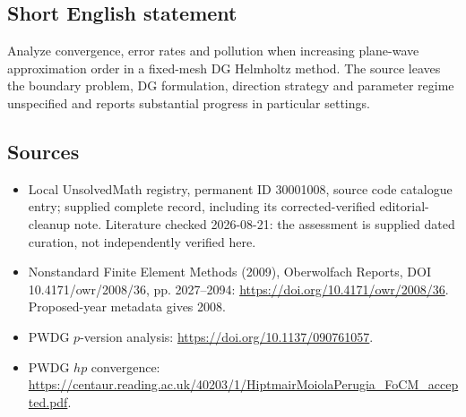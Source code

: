 \documentclass[11pt]{article}
\begin{document}
\subsection{Short English statement}
Analyze convergence, error rates and pollution when increasing plane-wave approximation order in a fixed-mesh DG Helmholtz method. The source leaves the boundary problem, DG formulation, direction strategy and parameter regime unspecified and reports substantial progress in particular settings.
\subsection{Sources}
\begin{itemize}
\item Local UnsolvedMath registry, permanent ID 30001008, source code catalogue entry; supplied complete record, including its corrected-verified editorial-cleanup note. Literature checked 2026-08-21: the assessment is supplied dated curation, not independently verified here.
\item Nonstandard Finite Element Methods (2009), Oberwolfach Reports, DOI 10.4171/owr/2008/36, pp. 2027--2094: \url{https://doi.org/10.4171/owr/2008/36}. Proposed-year metadata gives 2008.
\item PWDG $p$-version analysis: \url{https://doi.org/10.1137/090761057}.
\item PWDG $hp$ convergence: \url{https://centaur.reading.ac.uk/40203/1/HiptmairMoiolaPerugia_FoCM_accepted.pdf}.
\end{itemize}
\end{document}
